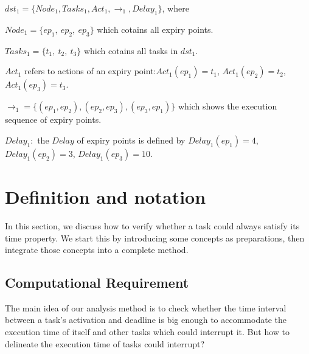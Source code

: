 \documentclass[sigconf]{acmart}
\begin{document}
$dst_1=\{Node_1,Tasks_1,Act_1,\rightarrow_1,Delay_1\}$, where 
\begin{compactitem}
\item $Node_1=\{ep_1,\ ep_2,\ ep_3\}$ which cotains all expiry points.
\item $Tasks_1=\{t_1,\ t_2,\ t_3\}$ which cotains all tasks in $dst_1$.
\item $Act_1$ refers to actions of an expiry point:$Act_1(ep_1)=t_1$, $Act_1(ep_2)=t_2$, $Act_1(ep_3)=t_3$.
\item $\rightarrow_1=\{(ep_1,ep_2),(ep_2,ep_3),(ep_3,ep_1)\}$ which shows the execution sequence of expiry points.
\item $Delay_1:$ the $Delay$ of expiry points is defined by $Delay_1(ep_1)=4$, $Delay_1(ep_2)=3$, $Delay_1(ep_3)=10$.
\end{compactitem}


\section{Definition and notation}\label{section_definition}
In this section, we discuss how to verify whether a task could always satisfy its time property. We start this by introducing some concepts as preparations, then integrate those concepts into a complete method.

\subsection{Computational Requirement}
The main idea of our analysis method is to check whether the time interval between a task's activation and deadline is big enough to accommodate the execution time of itself and other tasks which could interrupt it. But how to delineate the execution time of tasks could interrupt?
\end{document}
